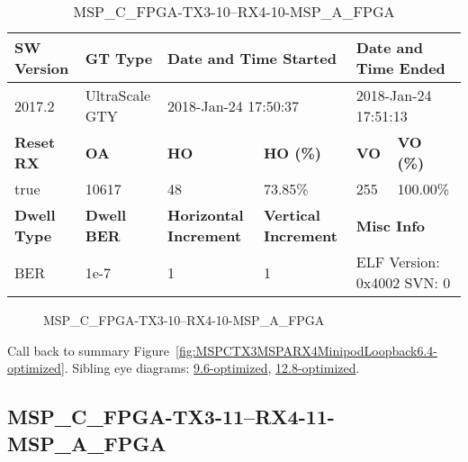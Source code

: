 \begin{table}[h]
\centering
\caption{MSP\_C\_FPGA-TX3-10--RX4-10-MSP\_A\_FPGA}
\label{tab:MSPCFPGATX310RX410MSPAFPGA6.4-optimized}
\begin{tabular}{@{}|l|l|l|l|l|l|@{}}
\toprule
\textbf{SW Version}                & \textbf{GT Type}   & \multicolumn{2}{l|}{\textbf{Date and Time Started}}            & \multicolumn{2}{l|}{\textbf{Date and Time Ended}}        \\ \midrule
2017.2                       & UltraScale GTY          & \multicolumn{2}{l|}{2018-Jan-24 17:50:37}                   & \multicolumn{2}{l|}{2018-Jan-24 17:51:13}               \\ \midrule
\textbf{Reset RX}                  & \textbf{OA} & \textbf{HO}   & \textbf{HO (\%)} & \textbf{VO} & \textbf{VO (\%)} \\ \midrule
true & 10617        & 48          & 73.85\%        & 255        & 100.00\%       \\ \midrule
\textbf{Dwell Type}                & \textbf{Dwell BER} & \textbf{Horizontal Increment} & \textbf{Vertical Increment}    & \multicolumn{2}{l|}{\textbf{Misc Info}}                  \\ \midrule
BER                            & 1e-7        & 1        & 1           & \multicolumn{2}{l|}{ELF Version: 0x4002 SVN: 0}                         \\ \bottomrule
\end{tabular}
\end{table}

\begin{figure}[h]
\caption{MSP\_C\_FPGA-TX3-10--RX4-10-MSP\_A\_FPGA} \label{fig:MSPCFPGATX310RX410MSPAFPGA6.4-optimized}
\end{figure}

Call back to summary Figure~\ref{fig:MSPCTX3MSPARX4MinipodLoopback6.4-optimized}.
Sibling eye diagrams: \hyperref[sec:MSPCFPGATX310RX410MSPAFPGA9.6-optimized]{9.6-optimized}, \hyperref[sec:MSPCFPGATX310RX410MSPAFPGA12.8-optimized]{12.8-optimized}.

\clearpage
\newpage


\subsection{MSP\_C\_FPGA-TX3-11--RX4-11-MSP\_A\_FPGA}\label{sec:MSPCFPGATX311RX411MSPAFPGA6.4-optimized}

